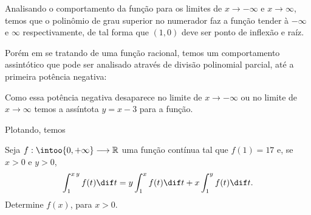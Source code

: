 \documentclass{IMTexam}
\begin{document}
\begin{questions}
\begin{solution}
			Analisando o comportamento da função para os limites de $ x\to-\infty $ e $ x\to\infty $, temos que o polinômio de grau superior no numerador faz a função tender à $ -\infty $ e $ \infty $ respectivamente, de tal forma que $ (1,0) $ deve ser ponto de inflexão e raíz.
			
			Porém em se tratando de uma função racional, temos um comportamento assintótico que pode ser analisado através de divisão polinomial parcial, até a primeira potência negativa:
			
			\begin{center}
			\end{center}
			
			Como essa potência negativa desaparece no limite de $ x\to-\infty $ ou no limite de $ x\to\infty $ temos a assíntota $ y=x-3 $ para a função.
			
			Plotando, temos
			
			\begin{center}
			\end{center}
		\end{solution}
		
		\clearpage
		
		\question Seja $ f:\intoo{0,+\infty}\longrightarrow\mathbb{R} $ uma função contínua tal que $ f(1)=17 $ e, se $ x>0 $ e $ y>0 $,
		\[ \int_{1}^{x\,y}f(t)\dif t=y\int_{1}^{x}f(t)\dif t+x\int_{1}^{y}f(t)\dif t. \]
		Determine $ f(x) $, para $ x>0 $.
		

\end{questions}
\end{document}
